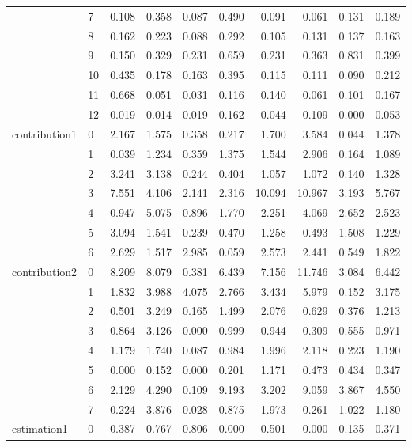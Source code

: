 \begin{table}
\begin{tabular}{llrrrrrrrr}
 & 7 & 0.108 & 0.358 & 0.087 & 0.490 & 0.091 & 0.061 & 0.131 & 0.189 \\
 & 8 & 0.162 & 0.223 & 0.088 & 0.292 & 0.105 & 0.131 & 0.137 & 0.163 \\
 & 9 & 0.150 & 0.329 & 0.231 & 0.659 & 0.231 & 0.363 & 0.831 & 0.399 \\
 & 10 & 0.435 & 0.178 & 0.163 & 0.395 & 0.115 & 0.111 & 0.090 & 0.212 \\
 & 11 & 0.668 & 0.051 & 0.031 & 0.116 & 0.140 & 0.061 & 0.101 & 0.167 \\
 & 12 & 0.019 & 0.014 & 0.019 & 0.162 & 0.044 & 0.109 & 0.000 & 0.053 \\
\cline{1-10}
\multirow[t]{7}{*}{contribution1} & 0 & 2.167 & 1.575 & 0.358 & 0.217 & 1.700 & 3.584 & 0.044 & 1.378 \\
 & 1 & 0.039 & 1.234 & 0.359 & 1.375 & 1.544 & 2.906 & 0.164 & 1.089 \\
 & 2 & 3.241 & 3.138 & 0.244 & 0.404 & 1.057 & 1.072 & 0.140 & 1.328 \\
 & 3 & 7.551 & 4.106 & 2.141 & 2.316 & 10.094 & 10.967 & 3.193 & 5.767 \\
 & 4 & 0.947 & 5.075 & 0.896 & 1.770 & 2.251 & 4.069 & 2.652 & 2.523 \\
 & 5 & 3.094 & 1.541 & 0.239 & 0.470 & 1.258 & 0.493 & 1.508 & 1.229 \\
 & 6 & 2.629 & 1.517 & 2.985 & 0.059 & 2.573 & 2.441 & 0.549 & 1.822 \\
\cline{1-10}
\multirow[t]{8}{*}{contribution2} & 0 & 8.209 & 8.079 & 0.381 & 6.439 & 7.156 & 11.746 & 3.084 & 6.442 \\
 & 1 & 1.832 & 3.988 & 4.075 & 2.766 & 3.434 & 5.979 & 0.152 & 3.175 \\
 & 2 & 0.501 & 3.249 & 0.165 & 1.499 & 2.076 & 0.629 & 0.376 & 1.213 \\
 & 3 & 0.864 & 3.126 & 0.000 & 0.999 & 0.944 & 0.309 & 0.555 & 0.971 \\
 & 4 & 1.179 & 1.740 & 0.087 & 0.984 & 1.996 & 2.118 & 0.223 & 1.190 \\
 & 5 & 0.000 & 0.152 & 0.000 & 0.201 & 1.171 & 0.473 & 0.434 & 0.347 \\
 & 6 & 2.129 & 4.290 & 0.109 & 9.193 & 3.202 & 9.059 & 3.867 & 4.550 \\
 & 7 & 0.224 & 3.876 & 0.028 & 0.875 & 1.973 & 0.261 & 1.022 & 1.180 \\
\cline{1-10}
\multirow[t]{2}{*}{estimation1} & 0 & 0.387 & 0.767 & 0.806 & 0.000 & 0.501 & 0.000 & 0.135 & 0.371 \\

\end{tabular}
\end{table}
